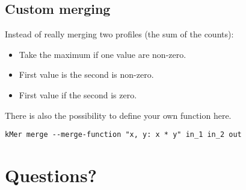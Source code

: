 \documentclass[slidestop]{beamer}
\begin{document}
\subsection{Custom merging}
\begin{pframe}
  Instead of really merging two profiles (the sum of the counts):
  \begin{itemize}
    \item Take the maximum if one value are non-zero.
    \item First value is the second is non-zero.
    \item First value if the second is zero.
  \end{itemize}
  \bigskip
  \pause

  There is also the possibility to define your own function here.
  \medskip

  \begin{lstlisting}[caption={Custom function selection.}]
    kMer merge --merge-function "x, y: x * y" in_1 in_2 out
  \end{lstlisting}
\end{pframe}

\section{Questions?}
\lastpagetemplate
\begin{pframe}
  \begin{center}
  \end{center}
\end{pframe}
\end{document}
